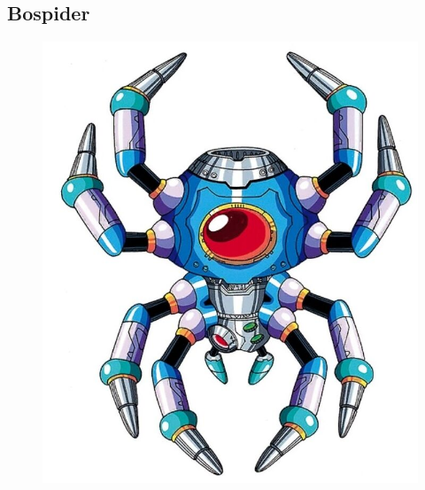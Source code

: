 \subsection{Bospider}\label{boss:bospider}
\begin{figure}[htp]
	\centering
	\includegraphics[height=\portraitsize]{figures/X1/Sigma_stages/Bospider.jpg}

\end{figure}
